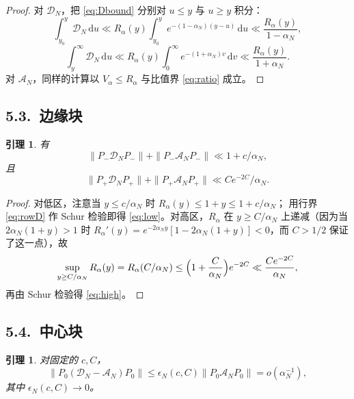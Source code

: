 \documentclass[12pt,a4paper]{amsart}
\numberwithin{equation}{section}
\theoremstyle{plain}
\newtheorem{lemma}[theorem]{引理}
\theoremstyle{definition}
\newcommand{\dd}{\,\mathrm{d}}
\begin{document}
\begin{proof}
对 $\mathscr D_N$，把 \eqref{eq:Dbound} 分别对 $u\le y$ 与 $u\ge y$ 积分：
\[
 \int_{y_0}^{y}\mathscr D_N\dd u\ll R_\alpha(y)\int_{y_0}^{y}
 e^{-(1-\alpha_N)(y-u)}\dd u\ll\frac{R_\alpha(y)}{1-\alpha_N},
\]
\[
 \int_{y}^{\infty}\mathscr D_N\dd u\ll R_\alpha(y)
 \int_0^{\infty}e^{-(1+\alpha_N)v}\dd v\ll\frac{R_\alpha(y)}{1+\alpha_N}.
\]
对 $\mathscr A_N$，同样的计算以 $V_\alpha\le R_\alpha$ 与比值界 \eqref{eq:ratio}
成立。
\end{proof}

\subsection*{5.3.\ 边缘块}

\begin{lemma}\label{lem:edge}
有
\begin{equation}\label{eq:low}
 \|P_-\mathcal D_NP_-\|+\|P_-\mathscr A_NP_-\|\ll1+c/\alpha_N,
\end{equation}
且
\begin{equation}\label{eq:high}
 \|P_+\mathcal D_NP_+\|+\|P_+\mathscr A_NP_+\|\ll Ce^{-2C}/\alpha_N .
\end{equation}
\end{lemma}

\begin{proof}
对低区，注意当 $y\le c/\alpha_N$ 时 $R_\alpha(y)\le1+y\le1+c/\alpha_N$；
用行界 \eqref{eq:rowD} 作 Schur 检验即得 \eqref{eq:low}。对高区，$R_\alpha$ 在
$y\ge C/\alpha_N$ 上递减（因为当 $2\alpha_N(1+y)>1$ 时
$R_\alpha'(y)=e^{-2\alpha_Ny}[1-2\alpha_N(1+y)]<0$，而 $C>1/2$ 保证了这一点），故
\[
 \sup_{y\ge C/\alpha_N}R_\alpha(y)=R_\alpha(C/\alpha_N)
 \le\Bigl(1+\frac C{\alpha_N}\Bigr)e^{-2C}\ll\frac{Ce^{-2C}}{\alpha_N},
\]
再由 Schur 检验得 \eqref{eq:high}。
\end{proof}

\subsection*{5.4.\ 中心块}

\begin{lemma}\label{lem:center}
对固定的 $c,C$，
\begin{equation}\label{eq:center}
 \|P_0(\mathcal D_N-\mathscr A_N)P_0\|\le\epsilon_N(c,C)\|P_0\mathscr A_NP_0\|
 =o(\alpha_N^{-1}),
\end{equation}
其中 $\epsilon_N(c,C)\to0$。
\end{lemma}
\end{document}
